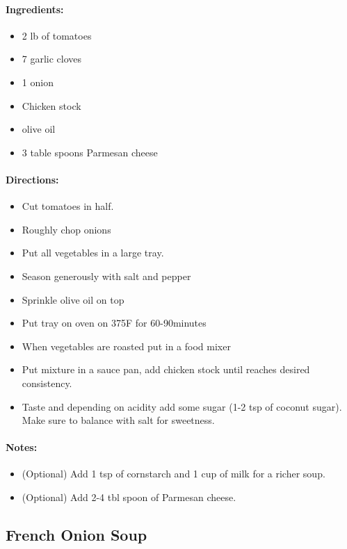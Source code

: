 \documentclass{article}
\begin{document}
\paragraph{Ingredients:}
\begin{itemize}
	\item 2 lb of tomatoes
	\item 7 garlic cloves
	\item 1 onion
	\item Chicken stock
	\item olive oil
	\item 3 table spoons Parmesan cheese
\end{itemize}

\paragraph{Directions:}
\begin{itemize}
	\item Cut tomatoes in half.
	\item Roughly chop onions
	\item Put all vegetables in a large tray.
	\item Season generously with salt and pepper
	\item Sprinkle olive oil on top
	\item Put tray on oven on 375F for 60-90minutes
	\item When vegetables are roasted put in a food mixer
	\item Put mixture in a sauce pan, add chicken stock until reaches desired consistency.
	\item Taste and depending on acidity add some sugar (1-2 tsp of coconut sugar). Make sure to balance with salt for sweetness.
\end{itemize}

\paragraph{Notes:}
\begin{itemize}
	\item (Optional) Add 1 tsp of cornstarch and 1 cup of milk for a richer soup.
	\item (Optional) Add 2-4 tbl spoon of Parmesan cheese.
\end{itemize}

\subsection{French Onion Soup}
\end{document}
